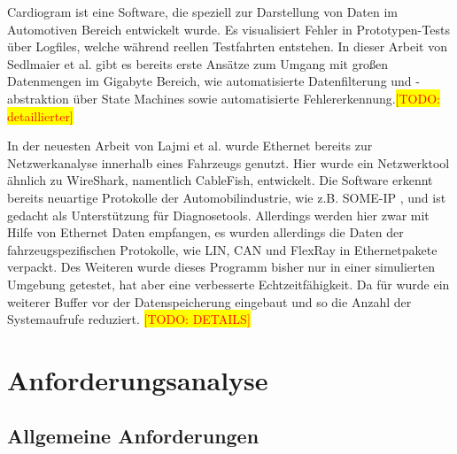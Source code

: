 \documentclass[draft=false
              ,paper=a4
              ,twoside=false
              ,fontsize=11pt
              ,headsepline
              ,BCOR10mm
              ,DIV11
              ]{scrbook}
\newcommand{\TODO}[1]{\colorbox{yellow}{\textcolor{red}{[TODO: #1]}}}
\begin{document}
Cardiogram \cite{sedlmair_cardiogram:_2011} ist eine Software, die speziell zur Darstellung von Daten im Automotiven Bereich entwickelt wurde. Es visualisiert Fehler in Prototypen-Tests über Logfiles, welche während reellen Testfahrten entstehen. In dieser Arbeit von Sedlmaier et al. gibt es bereits erste Ansätze zum Umgang mit großen Datenmengen im Gigabyte Bereich, wie automatisierte Datenfilterung und -abstraktion über State Machines sowie automatisierte Fehlererkennung.\TODO{detaillierter}


In der neuesten Arbeit von Lajmi et al. \cite{lajmi_using_2013} wurde Ethernet bereits zur Netzwerkanalyse innerhalb eines Fahrzeugs genutzt. Hier wurde ein Netzwerktool ähnlich zu WireShark, namentlich CableFish, entwickelt. Die Software erkennt bereits neuartige Protokolle der Automobilindustrie, wie z.B. SOME-IP \cite{someip_scalable_2014}, und ist gedacht als Unterstützung für Diagnosetools. Allerdings werden hier zwar mit Hilfe von Ethernet Daten empfangen, es wurden allerdings die Daten der fahrzeugspezifischen Protokolle, wie LIN, CAN und FlexRay in Ethernetpakete verpackt. Des Weiteren wurde dieses Programm bisher nur in einer simulierten Umgebung getestet, hat aber eine verbesserte Echtzeitfähigkeit. Da für wurde ein weiterer Buffer vor der Datenspeicherung eingebaut und so die Anzahl der Systemaufrufe reduziert. \TODO{DETAILS}\fi

\chapter{Anforderungsanalyse} %
\label{cha:anforderungsanalyse}

\section{Allgemeine Anforderungen} %
\label{sec:allgemeine_anforderungen}
\end{document}
